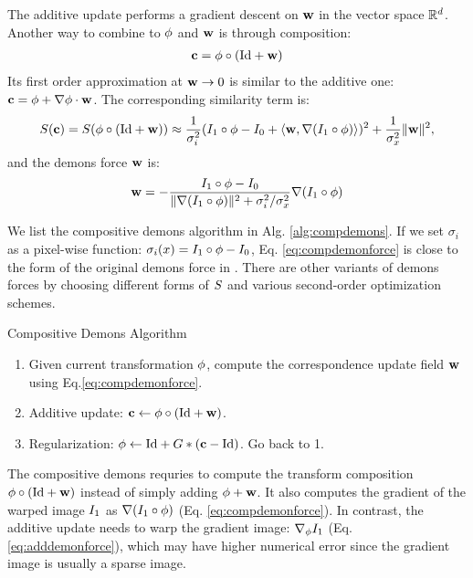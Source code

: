 \documentclass[letterpaper,12pt]{article}
\begin{document}
The additive update performs a gradient descent on $\mathbf{w}$ in the vector
space $\mathbb{R}^d$. Another way to combine to $\phi$ and $\mathbf{w}$ is through composition:
\begin{align}
\mathbf{c} = \phi \circ \left( \text{Id} + \mathbf{w} \right)
\label{eq:demoncomp}
\end{align}
Its first order approximation at $\mathbf{w} \to 0$ is similar to the additive one: $\mathbf{c} = \phi + \nabla\phi\cdot\mathbf{w}$. The corresponding similarity term is:
\begin{align}
S(\mathbf{c}) = S(\phi \circ (\text{Id} + \mathbf{w}) ) \approx
\frac{1}{\sigma_i^2} ( I_1 \circ \phi - I_0 + \langle \mathbf{w}, \nabla (I_1 \circ \phi ) \rangle )^2 
+ \frac{1}{\sigma_x^2} \| \mathbf{w} \|^2,
\end{align}
and the demons force $\mathbf{w}$ is:
\begin{align}
\mathbf{w} = -\frac{I_1 \circ \phi - I_0 }
           {\|\nabla (I_1 \circ \phi )\|^2 + {\sigma_i^2}/{\sigma_x^2}}
           \nabla (I_1 \circ \phi )
\label{eq:compdemonforce}           
\end{align}

We list the compositive demons algorithm in Alg. \ref{alg:compdemons}. 
If we set $\sigma_i$ as a pixel-wise function: $\sigma_i(x) = I_1 \circ \phi - I_0 $, Eq. \ref{eq:compdemonforce} is close to the form of the original demons force in \cite{Thirion98}. There are other variants of demons forces by choosing different forms of $S$ and various second-order optimization schemes. 

\begin{algorithm}
\caption{Compositive Demons Algorithm}
\label{alg:compdemons}
\begin{enumerate}
\item{Given current transformation $\phi$, compute the correspondence update field $\mathbf{w}$ using Eq.\ref{eq:compdemonforce}. 
}
\item{Additive update: $\mathbf{c} \leftarrow \phi \circ \left( \text{Id} + \mathbf{w} \right)$.
}
\item{Regularization: $\phi \leftarrow \text{Id} + {G} \ast (\mathbf{c} - \text{Id})$. Go back to 1.
}
\end{enumerate}
\end{algorithm}

The compositive demons requries to compute the transform composition $\phi \circ \left( \text{Id} + \mathbf{w} \right)$ instead of simply adding $\phi + \mathbf{w}$. It also computes the gradient of the warped image $I_1$ as $\nabla (I_1 \circ \phi)$ (Eq. \ref{eq:compdemonforce}). In contrast, the additive update needs to warp the gradient image: $\nabla_{\phi}I_1$ (Eq. \ref{eq:adddemonforce}), which may have higher numerical error since the gradient image is usually a sparse image.
\end{document}
